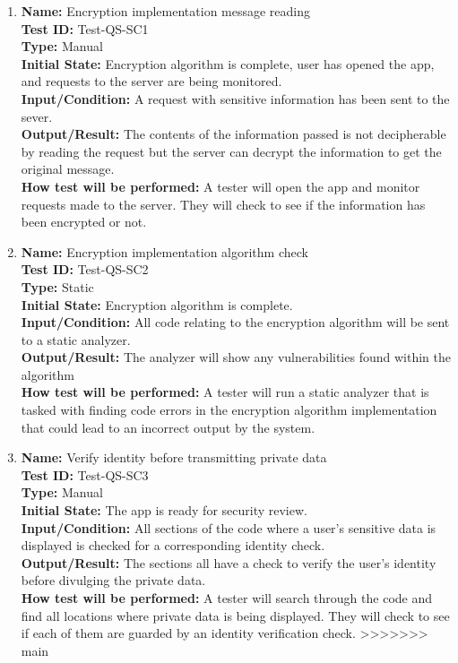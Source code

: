 \documentclass[12pt, titlepage]{article}
\begin{document}
\begin{enumerate}
\begin{enumerate}

    \item
    \textbf{Name:} Encryption implementation message reading \label{itm:Test-QS-SC1} \\
    \textbf{Test ID:} Test-QS-SC1 \\
    \textbf{Type:} Manual \\
    \textbf{Initial State:} Encryption algorithm is complete, user has opened the app, and requests to the server are being monitored. \\
    \textbf{Input/Condition:} A request with sensitive information has been sent to the sever. \\
    \textbf{Output/Result:} The contents of the information passed is not decipherable by reading the request but the server can decrypt the information to get the original message. \\
    \textbf{How test will be performed:} A tester will open the app and monitor requests made to the server. They will check to see if the information has been encrypted or not.

    \item
    \textbf{Name:} Encryption implementation algorithm check \label{itm:Test-QS-SC2} \\
    \textbf{Test ID:} Test-QS-SC2 \\
    \textbf{Type:} Static \\
    \textbf{Initial State:} Encryption algorithm is complete. \\
    \textbf{Input/Condition:} All code relating to the encryption algorithm will be sent to a static analyzer. \\
    \textbf{Output/Result:} The analyzer will show any vulnerabilities found within the algorithm \\
    \textbf{How test will be performed:} A tester will run a static analyzer that is tasked with finding code errors in the encryption algorithm implementation that could lead to an incorrect output by the system.

    \item
    \textbf{Name:} Verify identity before transmitting private data \label{itm:Test-QS-SC3} \\
    \textbf{Test ID:} Test-QS-SC3 \\
    \textbf{Type:} Manual \\
    \textbf{Initial State:} The app is ready for security review. \\
    \textbf{Input/Condition:} All sections of the code where a user's sensitive data is displayed is checked for a corresponding identity check. \\
    \textbf{Output/Result:} The sections all have a check to verify the user's identity before divulging the private data. \\
    \textbf{How test will be performed:} A tester will search through the code and find all locations where private data is being displayed. They will check to see if each of them are guarded by an identity verification check.
>>>>>>> main


\end{enumerate}
\end{enumerate}
\end{document}
